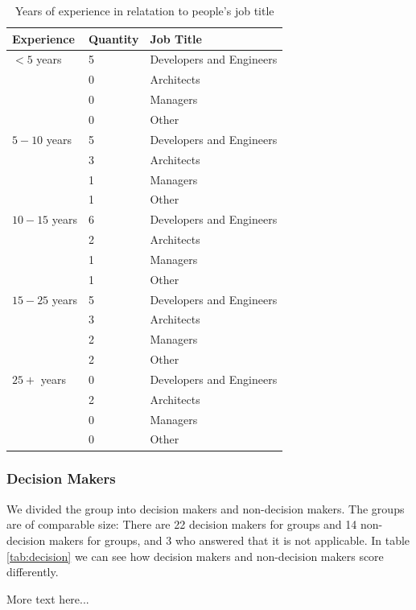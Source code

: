\documentclass{article}
\begin{document}
\begin{table}[H]
\centering
\begin{tabularx}{\columnwidth}{l l X}
\textbf{Experience} &  \textbf{Quantity}        & \textbf{Job Title} \\ \hline
$< 5$ years	    &   5   &	Developers and Engineers \\
&   0   &	Architects \\
&   0   &	Managers \\ \
	    &   0   &	Other \\ \hline
$5 - 10$ years	&   5   &	Developers and Engineers \\
&   3   &	Architects \\
&   1   &	Managers \\
&   1   &	Other \\ \hline
$10 - 15$ years	&   6   &	Developers and Engineers \\
&   2   &	Architects \\
&   1   &	Managers \\
&   1   &	Other \\ \hline
$15 - 25$ years	&   5   &	Developers and Engineers \\
&   3   &	Architects \\
&   2   &	Managers \\ \
	&   2   &	Other \\ \hline
$25+$ years	&0&	Developers and Engineers \\
&   2   &	Architects \\
&   0   &	Managers \\
&   0   &	Other \\ \hline
\end{tabularx}
\caption{Years of experience in relatation to people's job title}
\label{tab:jobExp}
\end{table}

\subsubsection{Decision Makers}
We divided the group into decision makers and non-decision makers. The
groups are of comparable size: There are 22 decision makers for groups
and 14 non-decision makers for groups, and 3 who answered that it is not
applicable. In table \ref{tab:decision} we can see how decision makers and non-decision makers score differently.

More text here...
\end{document}
